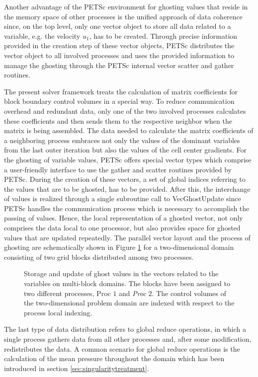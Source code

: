 Another advantage of the PETSc environment for ghosting values that reside in the memory space of other processes is the unified approach of data coherence since, on the top level, only one vector object to store all data related to a variable, e.g. the velocity \(u_1\), has to be created. Through precise information provided in the creation step of these vector objects, PETSc distributes the vector object to all involved processes and uses the provided information to manage the ghosting through the PETSc internal vector scatter and gather routines. 

The present solver framework treats the calculation of matrix coefficients for block boundary control volumes in a special way. To reduce communication overhead and redundant data, only one of the two involved processes calculates these coefficients and then sends them to the respective neighbor when the matrix is being assembled. The data needed to calculate the matrix coefficients of a neighboring process embraces not only the values of the dominant variables from the last outer iteration but also the values of the cell center gradients. For the ghosting of variable values, PETSc offers special vector types which comprise a user-friendly interface to use the gather and scatter routines provided by PETSc. During the creation of these vectors, a set of global indices referring to the values that are to be ghosted, has to be provided. After this, the interchange of values is realized through a single subroutine call to \textrm{VecGhostUpdate} since PETSc handles the communication process which is necessary to accomplish the passing of values. Hence, the local representation of a ghosted vector, not only comprises the data local to one processor, but also provides space for ghosted values that are updated repeatedly. The parallel vector layout and the process of ghosting are schematically shown in Figure \ref{fig:ghosting} for a two-dimensional domain consisting of two grid blocks distributed among two processes.

\begin{figure}[h!]
  \centering
  
  \caption{Storage and update of ghost values in the vectors related to the variables on multi-block domains. The blocks have been assigned to two different processes, \textrm{Proc} $1$ and \emph{Proc} $2$. The control volumes of the two-dimensional problem domain are indexed with respect to the process local indexing.}
  \label{fig:ghosting}
\end{figure}

The last type of data distribution refers to global reduce operations, in which a single process gathers data from all other processes and, after some modification, redistributes the data. A common scenario for global reduce operations is the calculation of the mean pressure throughout the domain which has been introduced in section \ref{sec:singularitytreatment}.



